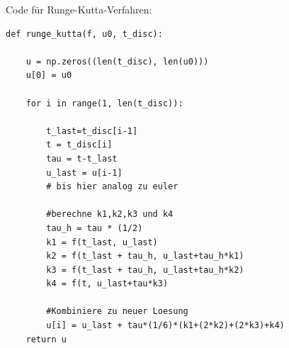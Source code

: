 \documentclass[german]{uebung}
\begin{document}
\;\newline
\label{codeD}Code f\"ur Runge-Kutta-Verfahren:
\begin{lstlisting}[frame=single]
def runge_kutta(f, u0, t_disc):
    
    u = np.zeros((len(t_disc), len(u0)))
    u[0] = u0
    
    for i in range(1, len(t_disc)):

        t_last=t_disc[i-1]
        t = t_disc[i]
        tau = t-t_last
        u_last = u[i-1]
        # bis hier analog zu euler
    
        #berechne k1,k2,k3 und k4
        tau_h = tau * (1/2)
        k1 = f(t_last, u_last)
        k2 = f(t_last + tau_h, u_last+tau_h*k1)
        k3 = f(t_last + tau_h, u_last+tau_h*k2)
        k4 = f(t, u_last+tau*k3)

        #Kombiniere zu neuer Loesung
        u[i] = u_last + tau*(1/6)*(k1+(2*k2)+(2*k3)+k4)
    return u
    
\end{lstlisting}
\end{document}
